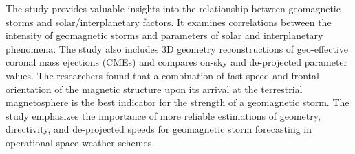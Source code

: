 The study provides valuable insights into the relationship between geomagnetic storms and solar/interplanetary factors. It examines correlations between the intensity of geomagnetic storms and parameters of solar and interplanetary phenomena. The study also includes 3D geometry reconstructions of geo-effective coronal mass ejections (CMEs) and compares on-sky and de-projected parameter values. The researchers found that a combination of fast speed and frontal orientation of the magnetic structure upon its arrival at the terrestrial magnetosphere is the best indicator for the strength of a geomagnetic storm. The study emphasizes the importance of more reliable estimations of geometry, directivity, and de-projected speeds for geomagnetic storm forecasting in operational space weather schemes.

























































